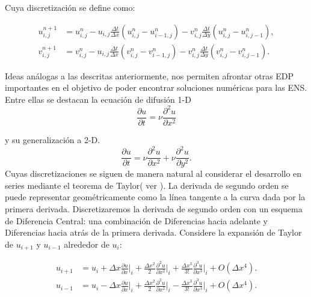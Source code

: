 \documentclass[A4,11pt]{article}
\begin{document}
\begin{multicols}{2}
Cuya discretización se define como:

\begin{tiny}
	\begin{equation}
		\label{decnl2d}
		\begin{split}
			u_{i,j}^{n+1} &= u_{i,j}^n - u_{i,j} \frac{\Delta t}{\Delta x} (u_{i,j}^n-u_{i-1,j}^n) - v_{i,j}^n \frac{\Delta t}{\Delta y} (u_{i,j}^n-u_{i,j-1}^n),\\	
			v_{i,j}^{n+1} &= v_{i,j}^n - u_{i,j} \frac{\Delta t}{\Delta x} (v_{i,j}^n-v_{i-1,j}^n) - v_{i,j}^n \frac{\Delta t}{\Delta y}
			(v_{i,j}^n-v_{i,j-1}^n).
		\end{split}
	\end{equation}
\end{tiny}

Ideas análogas a las descritas anteriormente, nos permiten afrontar otras EDP importantes en el objetivo de poder encontrar soluciones numéricas para las ENS. Entre ellas se destacan la ecuación de difusión 1-D 
\begin{equation}
	\label{ed}
	\frac{\partial u}{\partial t}= \nu \frac{\partial^2 u}{\partial x^2}
\end{equation}

y su generalización a 2-D.
\begin{equation}
	\label{ed2d}
	\frac{\partial u}{\partial t} = \nu \frac{\partial ^2 u}{\partial x^2} + \nu \frac{\partial ^2 u}{\partial y^2}.
\end{equation}
Cuyas discretizaciones se siguen de manera natural al considerar el desarrollo en series mediante el teorema de Taylor( ver \cite{LeonardoED, LeonardoEDP2d}). La derivada de segundo orden se puede representar geométricamente como la línea tangente a la curva dada por la primera derivada. Discretizaremos la derivada de segundo orden con un esquema de Diferencia Central: una combinación de Diferencias hacia adelante y Diferencias hacia atrás de la primera derivada. Considere la expansión de Taylor de $ u_{i + 1} $ y $ u_{i-1} $ alrededor de $ u_i $:

\begin{tiny}
\begin{equation*}
	\begin{split}
		u_{i+1} &= u_i + \Delta x \frac{\partial u}{\partial x}\bigg|_i + \frac{\Delta x^2}{2} \frac{\partial ^2 u}{\partial x^2}\bigg|_i + \frac{\Delta x^3}{3!} \frac{\partial ^3 u}{\partial x^3}\bigg|_i + O(\Delta x^4).\\
		u_{i-1} &= u_i - \Delta x \frac{\partial u}{\partial x}\bigg|_i + \frac{\Delta x^2}{2} \frac{\partial ^2 u}{\partial x^2}\bigg|_i - \frac{\Delta x^3}{3!} \frac{\partial ^3 u}{\partial x^3}\bigg|_i + O(\Delta x^4).
	\end{split}	
\end{equation*}	
\end{tiny}


\end{multicols}
\end{document}
